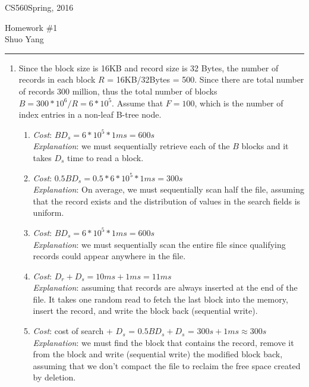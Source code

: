 \documentclass[10pt]{article}
\def\CourseCode{CS560}
\def\AssignmentNo{1}
\def\DateHandedOut{Spring, 2016}
\def\Author{Shuo Yang}
\begin{document}
\noindent

\CourseCode \hfill \DateHandedOut

\begin{center}
Homework \#\AssignmentNo\\
\Author\\
\end{center}

\hrule\smallskip

\begin{enumerate}
\item Since the block size is 16KB and record size is 32 Bytes, the
  number of records in each block $R$ = 16KB/32Bytes = 500. Since
  there are total number of records 300 million, thus the total number
  of blocks $B = 300 * 10^{6} / R = 6 * 10^5$. Assume that $F=100$,
  which is the number of index entries in a non-leaf B-tree node.
\begin{enumerate}
\item \emph{Cost}: $BD_s = 6 * 10^5 * 1ms = 600s$\\
  \emph{Explanation}: we must sequentially retrieve each of the $B$
  blocks and it takes $D_s$ time to read a block.
\item \emph{Cost}: $0.5BD_s = 0.5 * 6 * 10^5 * 1ms = 300s$\\
  \emph{Explanation}: On average, we must sequentially scan half the
  file, assuming that the record exists and the distribution of values
  in the search fields is uniform.
\item \emph{Cost}: $BD_s = 6 * 10^5 * 1ms = 600s$\\
  \emph{Explanation}: we must sequentially scan the entire file since
  qualifying records could appear anywhere in the file.
\item \emph{Cost}: $D_r + D_s = 10ms + 1ms = 11ms$\\
  \emph{Explanation}: assuming that records are always inserted at the
  end of the file. It takes one random read to fetch the last block
  into the memory, insert the record, and write the block back
  (sequential write).
\item \emph{Cost}: cost of search + $D_s$ = $0.5BD_s + D_s$ = $300s +
  1ms \approx 300s$\\
  \emph{Explanation}: we must find the block that contains the record,
  remove it from the block and write (sequential write) the modified
  block back, assuming that we don't compact the file to reclaim the
  free space created by deletion.


\end{enumerate}
\end{enumerate}
\end{document}
